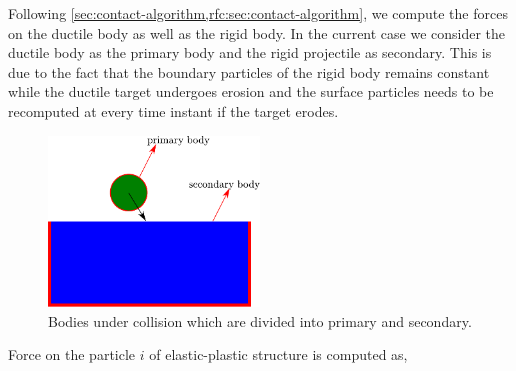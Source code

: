 Following \cref{sec:contact-algorithm,rfc:sec:contact-algorithm}, we compute the
forces on the ductile body as well as the rigid body. In the current case we
consider the ductile body as the primary body and the rigid projectile as
secondary. This is due to the fact that the boundary particles of the rigid body
remains constant while the ductile target undergoes erosion and the surface
particles needs to be recomputed at every time instant if the target erodes.
\begin{figure}[!htpb]
  \centering
  \includegraphics[width=0.5\textwidth]{images/erosion/images/contact_force/contact_force_divide}
  \caption{Bodies under collision which are divided into primary and
    secondary.}
\label{fig:erosion-cnt-force-divide-bodies}
\end{figure}

Force on the particle $i$ of elastic-plastic structure is computed as,



\FloatBarrier%
